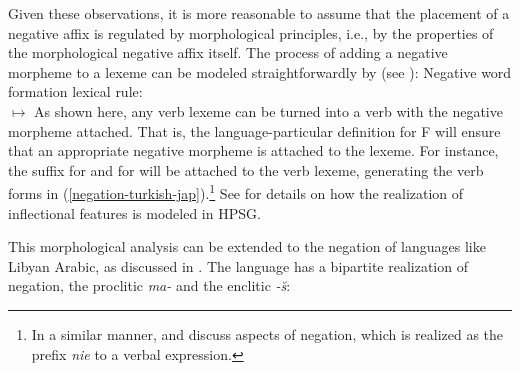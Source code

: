 \documentclass[output=paper
 	        ,biblatex
                ,babelshorthands
                ,newtxmath
                ,draftmode
                ,colorlinks, citecolor=brown
]{langscibook}
\begin{document}
\begin{exe}
\begin{xlist}
\begin{exe}
\begin{xlist}
Given these observations, it is more reasonable to assume that the placement of a
negative affix is regulated by morphological principles, i.e., by
the properties of the morphological negative affix itself.
The process of adding a negative morpheme to a lexeme can be modeled
straightforwardly by  (see \cites[\iaddpages]{Kim:00}[111--112\iaddpages]{Crowgey:12}):
\ea
\label{lr-neg-word-formation}
Negative word formation lexical rule:\\
 $\mapsto$
\avm{
[\type*{neg-v-lxm}
 phon < \normalfont !f$_{\mathit{neg}}$(\1)! >\\
 synsem|loc [ cat|head|pol \type{neg}\\
              cont [ \type*{neg-rel}
                     arg1 & \2 ]~~~~~]]
}
\z
%
%
As shown here, any verb lexeme can be turned into a verb with the negative
morpheme attached. That is, the language-particular definition for
F will ensure that an appropriate
negative morpheme is attached to the lexeme. For instance, the
suffix  for  and  for  will be attached to the verb
lexeme, generating the verb forms in (\ref{negation-turkish-jap}).\footnote{In a similar
manner, \citet{PK:99} and \citet{Prz:00, Prz:01}
discuss aspects of  negation, which is realized as the prefix
  \emph{nie} to a verbal expression.} See  for details on how the
realization of inflectional features is modeled in HPSG.

This morphological analysis can be extended to the negation of languages
like Libyan Arabic, as discussed in \citet{BK:12}. The language
has a bipartite realization of negation, the proclitic \emph{ma-} and the enclitic \emph{-\u{s}}:


\end{xlist}
\end{exe}
\end{xlist}
\end{exe}
\end{document}
